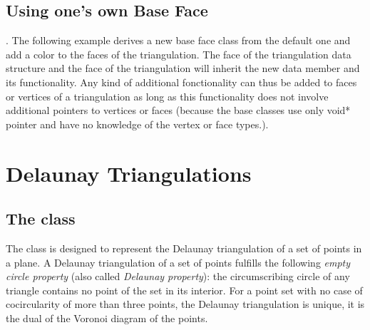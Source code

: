 \subsection{Using one's own Base Face}.
The following example derives a new base face class from the default
one and add a color to the faces of the triangulation. 
The face of the triangulation data structure
and the face of the triangulation will inherit the new data member 
and its functionality.
Any kind of additional fonctionality can thus be added to faces or vertices of a triangulation 
as long as this functionality  does not involve additional pointers to vertices or faces
(because the base classes use only void* pointer and have no knowledge
of the vertex or face types.).

\ccExample
{}



\section{Delaunay Triangulations}
\label{I1_Sect_Delaunay}


\subsection{The class \protect {}}
The class  is designed to represent
the Delaunay triangulation of a set of points in a plane.
A  Delaunay triangulation of a set of points
fulfills
the following {\em empty circle property} 
(also called {\em Delaunay property}): the circumscribing
circle of any triangle 
contains no point of the set in its interior.
For a point set with no case of cocircularity 
of more than three points,
the Delaunay triangulation is unique, it is  the dual
of the Voronoi diagram of the points.


